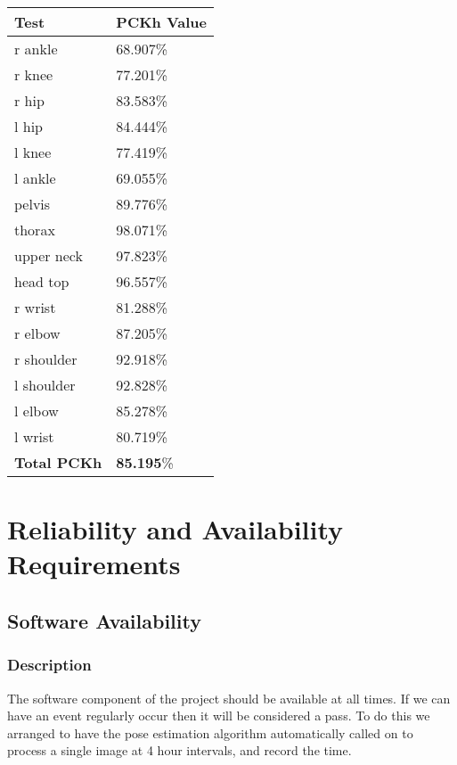 \documentclass{scrreprt}
\begin{document}
\begin{table}[H]
    \centering
    \begin{tabular}{||p{2.5cm}|p{2.5cm}||}
        \hline
        \textbf{Test} & \textbf {PCKh Value}\\
         \hline\hline
        r ankle & 68.907\% \\
        \hline
        r knee &  77.201\% \\
        \hline
        r hip & 83.583\% \\
        \hline
        l hip & 84.444\% \\
        \hline
        l knee & 77.419\% \\
        \hline
        l ankle & 69.055\% \\
        \hline
        pelvis & 89.776\% \\
        \hline
        thorax & 98.071\% \\
        \hline
        upper neck & 97.823\% \\
        \hline
        head top & 96.557\% \\
        \hline
        r wrist & 81.288\% \\
        \hline
        r elbow & 87.205\% \\
        \hline
        r shoulder & 92.918\% \\
        \hline
        l shoulder & 92.828\% \\
        \hline
        l elbow & 85.278\% \\
        \hline
        l wrist & 80.719\% \\
        \hline
        \textbf {Total PCKh} & \textbf {85.195}\% \\
        \hline
    \end{tabular}
\end{table}

\section{Reliability and Availability Requirements}
\subsection{Software Availability}
\subsubsection{Description}

The software component of the project should be available at all times. If we
can have an event regularly occur then it will be considered a pass. To do this
we arranged to have the pose estimation algorithm automatically called on to
process a single image at 4 hour intervals, and record the time.
\end{document}
